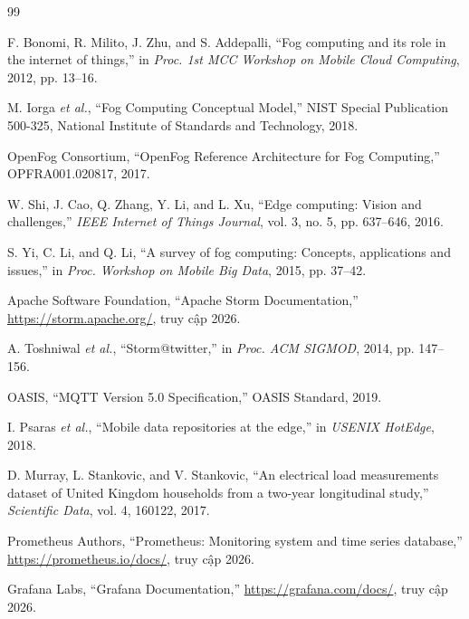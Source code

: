 \documentclass[13pt,a4paper]{report}
\begin{document}
\begin{thebibliography}{99}

 F. Bonomi, R. Milito, J. Zhu, and S. Addepalli,
``Fog computing and its role in the internet of things,'' in
\textit{Proc. 1st MCC Workshop on Mobile Cloud Computing}, 2012, pp. 13--16.

 M. Iorga \textit{et al.}, ``Fog Computing Conceptual Model,''
NIST Special Publication 500-325, National Institute of Standards and Technology,
2018.

 OpenFog Consortium, ``OpenFog Reference Architecture for
Fog Computing,'' OPFRA001.020817, 2017.

 W. Shi, J. Cao, Q. Zhang, Y. Li, and L. Xu,
``Edge computing: Vision and challenges,'' \textit{IEEE Internet of Things
Journal}, vol. 3, no. 5, pp. 637--646, 2016.

 S. Yi, C. Li, and Q. Li, ``A survey of fog computing: Concepts,
applications and issues,'' in \textit{Proc. Workshop on Mobile Big Data}, 2015,
pp. 37--42.

 Apache Software Foundation, ``Apache Storm Documentation,''
\url{https://storm.apache.org/}, truy cập 2026.

 A. Toshniwal \textit{et al.}, ``Storm@twitter,'' in
\textit{Proc. ACM SIGMOD}, 2014, pp. 147--156.

 OASIS, ``MQTT Version 5.0 Specification,'' OASIS Standard, 2019.

 I. Psaras \textit{et al.}, ``Mobile data repositories at the
edge,'' in \textit{USENIX HotEdge}, 2018.

 D. Murray, L. Stankovic, and V. Stankovic, ``An electrical load
measurements dataset of United Kingdom households from a two-year longitudinal
study,'' \textit{Scientific Data}, vol. 4, 160122, 2017.

 Prometheus Authors, ``Prometheus: Monitoring system and
time series database,'' \url{https://prometheus.io/docs/}, truy cập 2026.

 Grafana Labs, ``Grafana Documentation,''
\url{https://grafana.com/docs/}, truy cập 2026.


\end{thebibliography}
\end{document}
